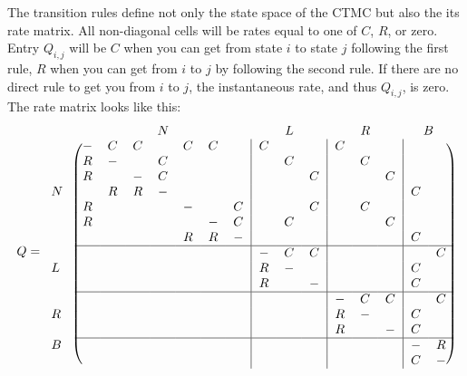 \documentclass[graybox]{svmult}
\begin{document}
The transition rules define not only the state space of the CTMC but also the its rate matrix. All non-diagonal cells will be rates equal to one of $C$, $R$, or zero. Entry $Q_{i,j}$ will be $C$ when you can get from state $i$ to state $j$ following the first rule, $R$ when you can get from $i$ to $j$ by following the second rule. If there are no direct rule to get you from $i$ to $j$, the instantaneous rate, and thus $Q_{i,j}$, is zero. The rate matrix looks like this:
\begin{equation}
  \label{eq:two-samples-ctmc}
  Q = 
\begin{blockarray}{lccccccccccccccc}
	\quad\;\;
 & \BAmulticolumn{7}{c}{N} & \BAmulticolumn{3}{c}{L} & \BAmulticolumn{3}{c}{R} & \BAmulticolumn{2}{c}{B} \\
\begin{block}{l(ccccccc|ccc|ccc|cc)}
  & - & C & C &   & C & C &   & C &   &   & C &   &   &   &   \\
  & R & - &   & C &    &     &   &   & C &   &   & C &   &   &   \\
  & R &   & - & C &   &   &   &   &  & C &   &   & C &   &   \\
  N &   & R & R & - &   &   &   &   &  &   &   &   &   & C &   \\ 
  & R &   &   &   & - &   & C &  &   & C &   & C &   &   &   \\
  & R &   &   &   &   & - & C &   & C &   &   &   & C &   &  \\
  &   &   &   &   & R & R & - &   &   &   &   &   &   & C &   \\
  \BAhhline{&---------------}
   & &   &   &  &   &   &   & - & C & C &   &   &   &   & C \\
  L & &   &   &  &   &   &   & R & - &   &   &   &   & C &   \\
   & &   &   &  &   &   &   & R &   & - &   &   &   & C &   \\ 
  \BAhhline{&---------------}
   & &   &   &  &   &   &   &   &   &   & - & C & C &   & C \\
  R & &   &   &  &   &   &   &   &   &   & R & - &   & C &   \\
   & &   &   &  &   &   &   &   &   &   & R &   & - & C &   \\ 
  \BAhhline{&---------------}
  B & &   &   &  &   &   &   &   &   &   &   &   &   & - & R \\
   & &   &   &  &   &   &   &   &   &   &   &   &   & C & - \\
\end{block}
\end{blockarray}
\end{equation}
\end{document}
